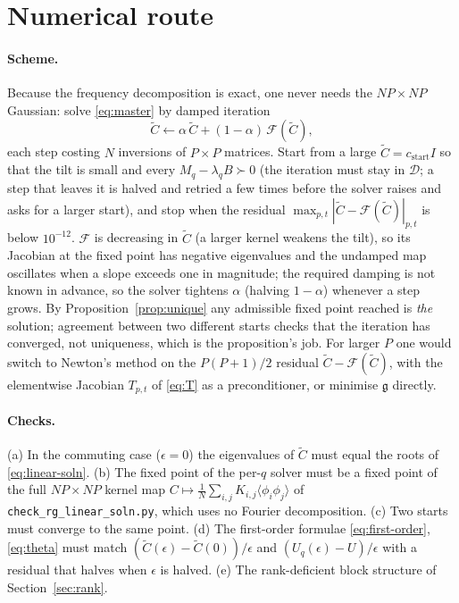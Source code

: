 \documentclass[11pt,a4paper]{article}
\newcommand{\Ct}{\tilde C}
\newcommand{\dom}{\mathcal D}
\begin{document}
\section{Numerical route}
\label{sec:numerical}
\paragraph{Scheme.}
Because the frequency decomposition is exact, one never needs the $NP\times NP$ Gaussian: solve \eqref{eq:master} by damped iteration
\begin{equation}
  \Ct \leftarrow \alpha\,\Ct + (1-\alpha)\,\mathcal F(\Ct),
\end{equation}
each step costing $N$ inversions of $P\times P$ matrices. Start from a large $\Ct = c_{\mathrm{start}} I$ so that the tilt is small and every $M_q - \lambda_q B \succ 0$ (the iteration must stay in $\dom$; a step that leaves it is halved and retried a few times before the solver raises and asks for a larger start), and stop when the residual $\max_{p,t}|\Ct - \mathcal F(\Ct)|_{p,t}$ is below $10^{-12}$. $\mathcal F$ is decreasing in $\Ct$ (a larger kernel weakens the tilt), so its Jacobian at the fixed point has negative eigenvalues and the undamped map oscillates when a slope exceeds one in magnitude; the required damping is not known in advance, so the solver tightens $\alpha$ (halving $1-\alpha$) whenever a step grows. By Proposition~\ref{prop:unique} any admissible fixed point reached is \emph{the} solution; agreement between two different starts checks that the iteration has converged, not uniqueness, which is the proposition's job. For larger $P$ one would switch to Newton's method on the $P(P+1)/2$ residual $\Ct - \mathcal F(\Ct)$, with the elementwise Jacobian $T_{p,t}$ of \eqref{eq:T} as a preconditioner, or minimise $\mathfrak g$ directly.

\paragraph{Checks.}
(a) In the commuting case ($\epsilon = 0$) the eigenvalues of $\Ct$ must equal the roots of \eqref{eq:linear-soln}. (b) The fixed point of the per-$q$ solver must be a fixed point of the full $NP\times NP$ kernel map $C \mapsto \frac1N\sum_{i,j}K_{i,j}\langle\phi_i\phi_j\rangle$ of \texttt{check\_rg\_linear\_soln.py}, which uses no Fourier decomposition. (c) Two starts must converge to the same point. (d) The first-order formulae \eqref{eq:first-order}, \eqref{eq:theta} must match $(\Ct(\epsilon)-\Ct(0))/\epsilon$ and $(U_q(\epsilon) - U)/\epsilon$ with a residual that halves when $\epsilon$ is halved. (e) The rank-deficient block structure of Section~\ref{sec:rank}.
\end{document}
